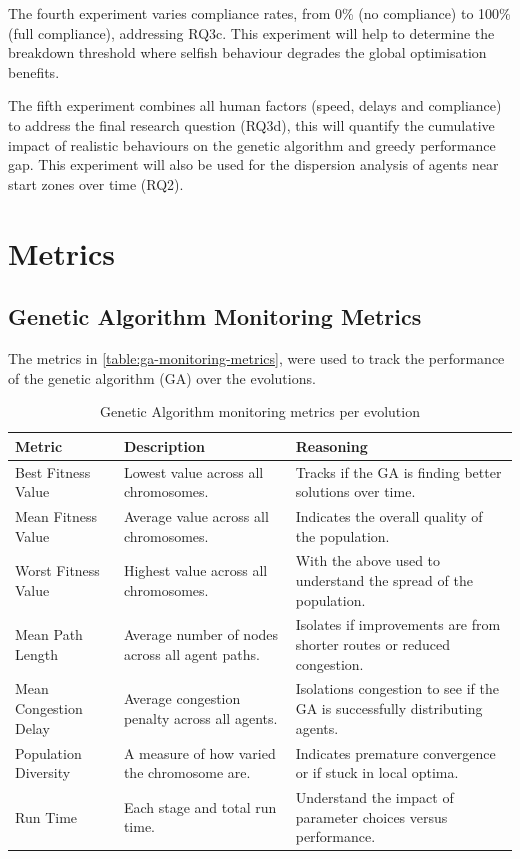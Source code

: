 \documentclass[12pt,a4paper]{report}
\begin{document}
The fourth experiment varies compliance rates, from 0\% (no compliance) to 100\% (full compliance), addressing RQ3c. This experiment will help to determine the breakdown threshold where selfish behaviour degrades the global optimisation benefits.

The fifth experiment combines all human factors (speed, delays and compliance) to address the final research question (RQ3d), this will quantify the cumulative impact of realistic behaviours on the genetic algorithm and greedy performance gap. This experiment will also be used for the dispersion analysis of agents near start zones over time (RQ2).

\section{Metrics}
\subsection{Genetic Algorithm Monitoring Metrics}
The metrics in \autoref{table:ga-monitoring-metrics}, were used to track the performance of the genetic algorithm (GA) over the evolutions.

\begin{table}[htb]
  \bigskip
  \begin{center}
    \begin{tabular}{| >{\raggedright\arraybackslash}p{3cm} | p{5cm} | p{6.5cm} |}
      \hline
      Metric & Description & Reasoning \\
      \hline
      \hline
      Best Fitness Value & Lowest value across all chromosomes. & Tracks if the GA is finding better solutions over time. \\
      \hline
      Mean Fitness Value & Average value across all chromosomes. & Indicates the overall quality of the population. \\
      \hline
      Worst Fitness Value & Highest value across all chromosomes. & With the above used to understand the spread of the population. \\
      \hline
      Mean Path Length & Average number of nodes across all agent paths. & Isolates if improvements are from shorter routes or reduced congestion. \\
      \hline
      Mean Congestion Delay & Average congestion penalty across all agents. & Isolations congestion to see if the GA is successfully distributing agents. \\
      \hline
      Population Diversity & A measure of how varied the chromosome are. & Indicates premature convergence or if stuck in local optima. \\
      \hline
      Run Time & Each stage and total run time. & Understand the impact of parameter choices versus performance. \\

      \hline
    \end{tabular}
  \end{center}
\caption{Genetic Algorithm monitoring metrics per evolution}
\label{table:ga-monitoring-metrics}
\end{table}
\end{document}
